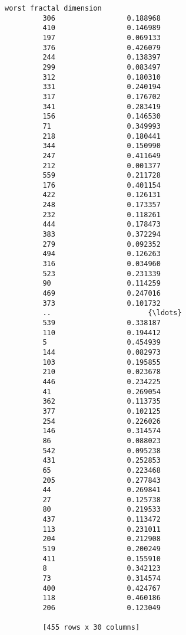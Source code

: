 \documentclass[11pt]{article}
\begin{document}
\begin{Verbatim}[commandchars=\\\{\}]
              worst fractal dimension  
         306                 0.188968  
         410                 0.146989  
         197                 0.069133  
         376                 0.426079  
         244                 0.138397  
         299                 0.083497  
         312                 0.180310  
         331                 0.240194  
         317                 0.176702  
         341                 0.283419  
         156                 0.146530  
         71                  0.349993  
         218                 0.180441  
         344                 0.150990  
         247                 0.411649  
         212                 0.001377  
         559                 0.211728  
         176                 0.401154  
         422                 0.126131  
         248                 0.173357  
         232                 0.118261  
         444                 0.178473  
         383                 0.372294  
         279                 0.092352  
         494                 0.126263  
         316                 0.034960  
         523                 0.231339  
         90                  0.114259  
         469                 0.247016  
         373                 0.101732  
         ..                       {\ldots}  
         539                 0.338187  
         110                 0.194412  
         5                   0.454939  
         144                 0.082973  
         103                 0.195855  
         210                 0.023678  
         446                 0.234225  
         41                  0.269054  
         362                 0.113735  
         377                 0.102125  
         254                 0.226026  
         146                 0.314574  
         86                  0.088023  
         542                 0.095238  
         431                 0.252853  
         65                  0.223468  
         205                 0.277843  
         44                  0.269841  
         27                  0.125738  
         80                  0.219533  
         437                 0.113472  
         113                 0.231011  
         204                 0.212908  
         519                 0.200249  
         411                 0.155910  
         8                   0.342123  
         73                  0.314574  
         400                 0.424767  
         118                 0.460186  
         206                 0.123049  
         
         [455 rows x 30 columns]
\end{Verbatim}
            
\end{document}
